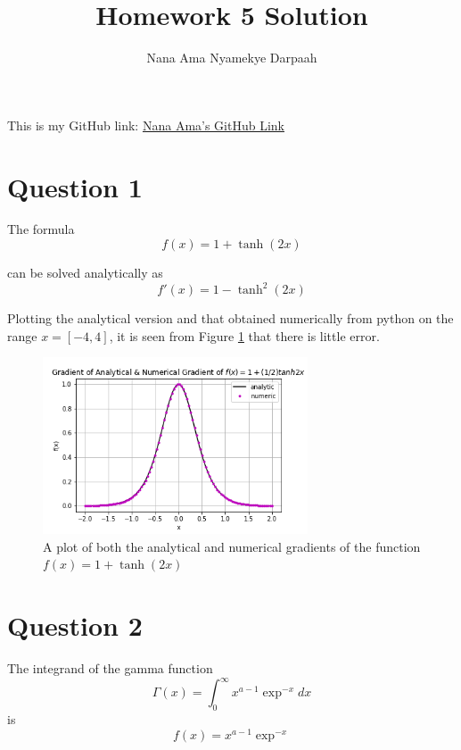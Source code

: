 \documentclass[11pt]{article}
\title{Homework 5 Solution}
\author{Nana Ama Nyamekye Darpaah}
\begin{document}
	
	\maketitle
This is my GitHub link: \href{https://github.com/nnd2016/phys-ga2000.git}{Nana Ama's GitHub Link}
	
\section{Question 1}

The formula
	\begin{equation}
	f(x) = 1 + \tanh(2x) 
	\end{equation}

can be solved analytically as 
	\begin{equation}
	f'(x) = 1 - \tanh^{2}(2x) 
	\end{equation}

Plotting the analytical version and that obtained numerically from python on the range $x = [-4, 4]$, it is seen from Figure \ref{fig:analytic vs numeric} that there is little error.
\\
\begin{figure}[h]\begin{center} 
		\vspace{12pt}
		\includegraphics[width=0.7\textwidth]{analytic vs numeric.png}
		\caption{A plot of both the analytical and numerical gradients of the function $f(x) = 1 + \tanh(2x)$ }
		\label{fig:analytic vs numeric} 
	\end{center}
\end{figure} 



\section{Question 2}

The integrand of the gamma function 
\begin{equation}
	\Gamma(x) = \int_{0}^{\infty}x^{a-1}\exp^{-x} dx
\end{equation} 
is 
\begin{equation}
	f(x) = x^{a-1}\exp^{-x} 
\end{equation}
\end{document}
